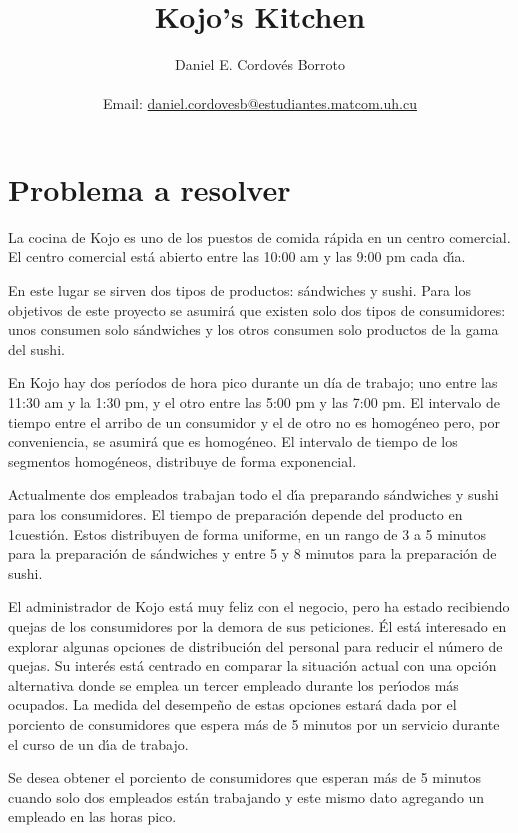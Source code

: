 \documentclass{article}
\author{Daniel E. Cordovés Borroto \\ \\ Email: \href{mailto:daniel.cordovesb@estudiantes.matcom.uh.cu}{daniel.cordovesb@estudiantes.matcom.uh.cu}}
\title{Kojo's Kitchen}
\begin{document}
	\maketitle
	\newpage
    
    \section*{Problema a resolver}
        La cocina de Kojo es uno de los puestos de comida rápida en un centro
        comercial. El centro comercial está abierto entre las 10:00 am y las 9:00 pm cada
        dı́a.
        
        En este lugar se sirven dos tipos de productos: sándwiches y sushi. Para los
        objetivos de este proyecto se asumirá que existen solo dos tipos de consumidores:
        unos consumen solo sándwiches y los otros consumen solo productos de la gama
        del sushi.
        
        En Kojo hay dos períodos de hora pico durante un día de trabajo;
        uno entre las 11:30 am y la 1:30 pm, y el otro entre las 5:00 pm y las 7:00
        pm. El intervalo de tiempo entre el arribo de un consumidor y el de otro no es
        homogéneo pero, por conveniencia, se asumirá que es homogéneo. El intervalo
        de tiempo de los segmentos homogéneos, distribuye de forma exponencial.

        Actualmente dos empleados trabajan todo el dı́a preparando sándwiches y
        sushi para los consumidores. El tiempo de preparación depende del producto en
        1cuestión. Estos distribuyen de forma uniforme, en un rango de 3 a 5 minutos
        para la preparación de sándwiches y entre 5 y 8 minutos para la preparación de
        sushi.

        El administrador de Kojo está muy feliz con el negocio, pero ha estado recibiendo
        quejas de los consumidores por la demora de sus peticiones. Él está interesado
        en explorar algunas opciones de distribución del personal para reducir
        el número de quejas. Su interés está centrado en comparar la situación actual con
        una opción alternativa donde se emplea un tercer empleado durante los perı́odos
        más ocupados. La medida del desempeño de estas opciones estará dada por el
        porciento de consumidores que espera más de 5 minutos por un servicio durante
        el curso de un dı́a de trabajo.

        Se desea obtener el porciento de consumidores que esperan más de 5 minutos
        cuando solo dos empleados están trabajando y este mismo dato agregando un
        empleado en las horas pico.
\end{document}
